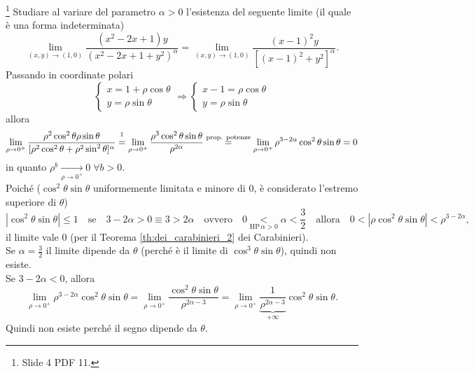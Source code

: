 \begin{example}\footnote{Slide 4 PDF 11.}
    Studiare al variare del parametro $\alpha>0$ l'esistenza del seguente limite (il quale è una forma indeterminata)
    \begin{equation*}
        \lim_{(x,y)\rightarrow(1,0)}\frac{(x^2-2x+1)y}{(x^2-2x+1+y^2)^\alpha}=\lim_{(x,y)\rightarrow(1,0)}\frac{(x-1)^2y}{[(x-1)^2+y^2]^\alpha}.
    \end{equation*}
    Passando in coordinate polari
    \begin{equation*}
        \begin{cases}
            x=1+\rho\cos\theta\\
            y=\rho\sin\theta
        \end{cases}\Longrightarrow 
        \begin{cases}
            x-1=\rho\cos\theta\\
            y=\rho\sin\theta
        \end{cases}
    \end{equation*}
    allora
    \begin{equation*}
        \lim_{\rho\rightarrow0^+}\frac{\rho^2\cos^2\theta\rho\sin\theta}{[\rho^2\cos^2\theta+\rho^2\sin^2\theta]^\alpha}\overset{\footnotemark}{=}\lim_{\rho\rightarrow 0^+}\frac{\rho^3\cos^2\theta\sin\theta}{\rho^{2\alpha}}\overset{\text{prop. potenze}}{=}\lim_{\rho\rightarrow 0^+}\rho^{3-2\alpha}\cos^2\theta\sin\theta=0
    \end{equation*}
    in quanto $\rho^b\underset{\rho\rightarrow0^+}{\longrightarrow}0\;\forall b>0$.\\
    Poiché ($\cos^2\theta\sin\theta$ uniformemente limitata e minore di 0, è considerato l'estremo superiore di $\theta$)
    \begin{equation*}
        |\cos^2\theta\sin\theta|\leq 1\quad\text{se}\quad 3-2\alpha>0\equiv3>2\alpha\quad\text{ovvero}\quad 0\underset{\text{HP}\, \alpha>0}{<}\alpha<\frac{3}{2}\quad\text{allora}\quad 0<|\rho\cos^2\theta\sin\theta|<\rho^{3-2\alpha},
    \end{equation*}
    il limite vale 0 (per il Teorema \ref{th:dei_carabinieri_2} dei Carabinieri).\\
    Se $\alpha=\frac{3}{2}$ il limite dipende da $\theta$ (perché è il limite di $\cos^3\theta\sin\theta$), quindi non esiste.\\
    Se $3-2\alpha<0$, allora
    \begin{equation*}
        \lim_{\rho\rightarrow0^+}\rho^{3-2\alpha}\cos^2\theta\sin\theta=\lim_{\rho\rightarrow0^+}\frac{\cos^2\theta\sin\theta}{\rho^{2\alpha-3}}=\lim_{\rho\rightarrow0^+}\underbrace{\frac{1}{\rho^{2\alpha-3}}}_{+\infty}\cos^2\theta\sin\theta.
    \end{equation*}
    Quindi non esiste perché il segno dipende da $\theta$.
\end{example}

